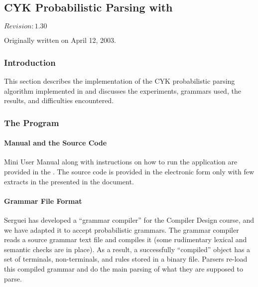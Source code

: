 %
%

\subsection{CYK Probabilistic Parsing with }
\label{sect:probabilistic-parsing-app}

$Revision: 1.30 $

Originally written on April 12, 2003.

\subsubsection{Introduction}

This section describes the implementation of the CYK probabilistic parsing
algorithm \cite{cyk} implemented in {\java} and discusses the experiments, grammars used,
the results, and difficulties encountered.

\subsubsection{The Program}

\paragraph{Manual and the Source Code}

Mini User Manual along with instructions on how to run the application are provided
in the . The source code is provided in the electronic form only with few extracts
in the presented in the document.

\paragraph{Grammar File Format}

Serguei has developed a ``grammar compiler'' for the Compiler Design course, and
we have adapted it to accept probabilistic grammars. The grammar compiler reads a source
grammar text file and compiles it (some rudimentary lexical and semantic checks are in place).
As a result, a successfully ``compiled''  object
has a set of terminals, non-terminals, and rules stored in a binary file.
Parsers re-load this compiled grammar and do the main parsing of what they are supposed to parse.


